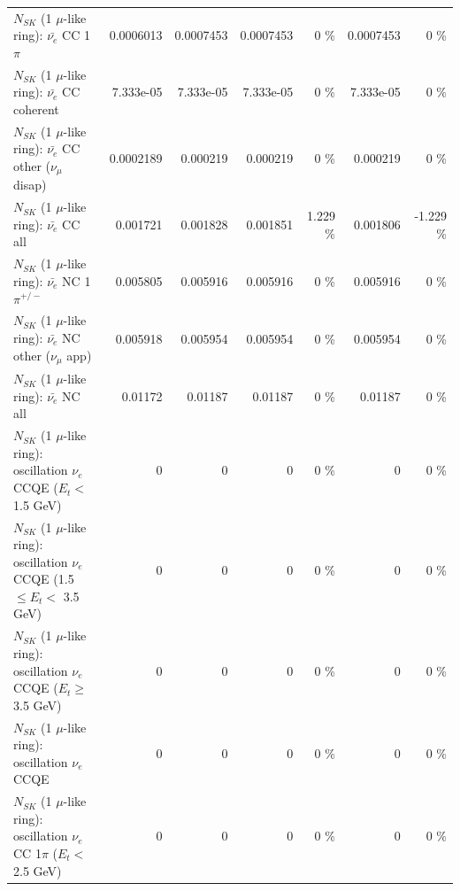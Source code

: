 \begin{table}
\begin{tabular}{| l | r | r | r  r | r  r |}
\hline
                           $N_{SK}$ (1 $\mu$-like ring): $\bar{\nu_e}$ CC 1$\pi$ &       0.0006013 &       0.0007453 &       0.0007453 &        0 \%  &       0.0007453 &        0 \%  \\ 
                         $N_{SK}$ (1 $\mu$-like ring): $\bar{\nu_e}$ CC coherent &       7.333e-05 &       7.333e-05 &       7.333e-05 &        0 \%  &       7.333e-05 &        0 \%  \\ 
          $N_{SK}$ (1 $\mu$-like ring): $\bar{\nu_e}$ CC other ($\nu_\mu$ disap) &       0.0002189 &        0.000219 &        0.000219 &        0 \%  &        0.000219 &        0 \%  \\ 
                            $N_{SK}$ (1 $\mu$-like ring): $\bar{\nu_{e}}$ CC all &        0.001721 &        0.001828 &        0.001851 &    1.229 \%  &        0.001806 &   -1.229 \%  \\ 
\hline
                     $N_{SK}$ (1 $\mu$-like ring): $\bar{\nu_e}$ NC 1$\pi^{+/-}$ &        0.005805 &        0.005916 &        0.005916 &        0 \%  &        0.005916 &        0 \%  \\ 
            $N_{SK}$ (1 $\mu$-like ring): $\bar{\nu_e}$ NC other ($\nu_\mu$ app) &        0.005918 &        0.005954 &        0.005954 &        0 \%  &        0.005954 &        0 \%  \\ 
                            $N_{SK}$ (1 $\mu$-like ring): $\bar{\nu_{e}}$ NC all &         0.01172 &         0.01187 &         0.01187 &        0 \%  &         0.01187 &        0 \%  \\ 
\hline
\hline
\hline
      $N_{SK}$ (1 $\mu$-like ring): oscillation $\nu_e$ CCQE ($E_{t} <$ 1.5 GeV) &               0 &               0 &               0 &        0 \%  &               0 &        0 \%  \\ 
$N_{SK}$ (1 $\mu$-like ring): oscillation $\nu_e$ CCQE (1.5 $\leq E_{t} <$ 3.5 GeV) &               0 &               0 &               0 &        0 \%  &               0 &        0 \%  \\ 
   $N_{SK}$ (1 $\mu$-like ring): oscillation $\nu_e$ CCQE ($E_{t} \geq$ 3.5 GeV) &               0 &               0 &               0 &        0 \%  &               0 &        0 \%  \\ 
\hline
                          $N_{SK}$ (1 $\mu$-like ring): oscillation $\nu_e$ CCQE &               0 &               0 &               0 &        0 \%  &               0 &        0 \%  \\ 
\hline
 $N_{SK}$ (1 $\mu$-like ring): oscillation $\nu_e$ CC 1$\pi$ ($E_{t} <$ 2.5 GeV) &               0 &               0 &               0 &        0 \%  &               0 &        0 \%  \\ 

\end{tabular}
\end{table}
